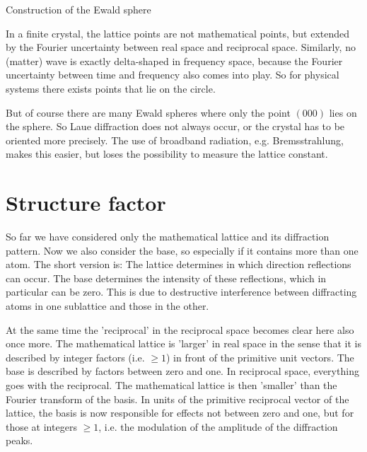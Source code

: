 \begin{marginfigure}

\caption{Construction of the Ewald sphere}
\end{marginfigure}


In a finite crystal, the lattice points are not mathematical points, but extended by the Fourier uncertainty between real space and reciprocal space. Similarly, no (matter) wave is exactly delta-shaped in frequency space, because the Fourier uncertainty between time and frequency also comes into play. So for physical systems there exists points that lie on the circle.

But of course there are many Ewald spheres where only the point $(000)$ lies on the sphere. So Laue diffraction does not always occur, or the crystal has to be oriented more precisely. The use of broadband radiation, e.g. Bremsstrahlung, makes this easier, but loses the possibility to measure the lattice constant.


\section{Structure factor}

So far we have considered only the mathematical lattice and its diffraction pattern. Now we also consider the base, so especially if it contains more than one atom. The short version is: The lattice determines in which direction reflections can occur. The base determines the intensity of these reflections, which in particular can be zero. This is due to destructive interference between diffracting atoms in one sublattice and those in the other.

At the same time the 'reciprocal' in the reciprocal space becomes clear here also once more. The mathematical lattice is 'larger' in real space in the sense that it is described by integer factors (i.e. $\ge 1$) in front of the primitive unit vectors. The base is described by factors between zero and one. In reciprocal space, everything goes with the reciprocal. The mathematical lattice is then 'smaller' than the Fourier transform of the basis. In units of the primitive reciprocal vector of the lattice, the basis is now responsible for effects not between zero and one, but for those at integers $\ge 1$, i.e. the modulation of the amplitude of the diffraction peaks.

